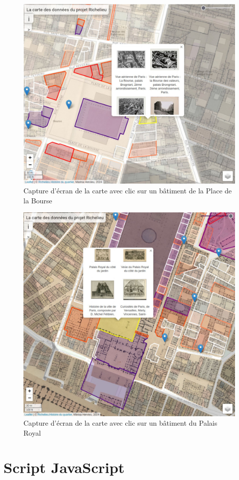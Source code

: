\documentclass[openany, a4paper, 12pt, twoside]{book}
\begin{document}
\begin{figure}
    \centering
    \includegraphics[width=1\linewidth]{annexes/carte-pbpb.jpeg}
    \caption{Capture d'écran de la carte avec clic sur un bâtiment de la Place de la Bourse}
    \label{fig:carte-pb}
\end{figure}

\begin{figure}
    \centering
    \includegraphics[width=1\linewidth]{annexes/carte-pr.jpeg}
    \caption{Capture d'écran de la carte avec clic sur un bâtiment du Palais Royal}
    \label{fig:carte-pr}
\end{figure}
\chapter{Script JavaScript}

\backmatter
\printglossaries
\listoftables
\listoffigures
\tableofcontents
\end{document}
